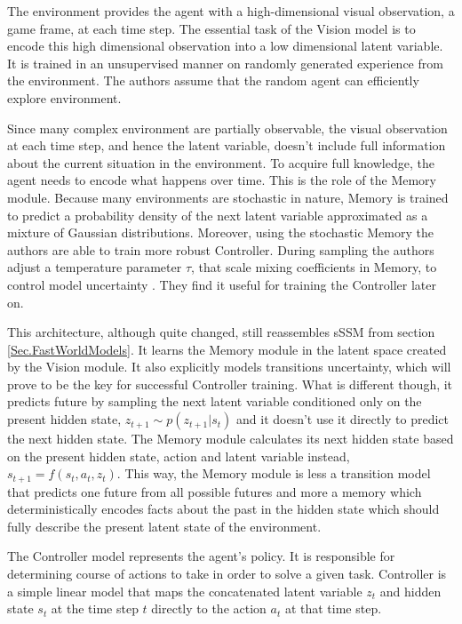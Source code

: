 The environment provides the agent with a high-dimensional visual observation, a game frame, at each time step. The essential task of the Vision model is to encode this high dimensional observation into a low dimensional latent variable. It is trained in an unsupervised manner on randomly generated experience from the environment. The authors assume that the random agent can efficiently explore environment.

Since many complex environment are partially observable, the visual observation at each time step, and hence the latent variable, doesn't include full information about the current situation in the environment. To acquire full knowledge, the agent needs to encode what happens over time. This is the role of the Memory module. Because many environments are stochastic in nature, Memory is trained to predict a probability density of the next latent variable approximated as a mixture of Gaussian distributions. Moreover, using the stochastic Memory the authors are able to train more robust Controller. During sampling the authors adjust a temperature parameter $\tau$, that scale mixing coefficients in Memory, to control model uncertainty \cite{Algo.Sketch-RNN}. They find it useful for training the Controller later on.

This architecture, although quite changed, still reassembles sSSM from section \ref{Sec.FastWorldModels}. It learns the Memory module in the latent space created by the Vision module. It also explicitly models transitions uncertainty, which will prove to be the key for successful Controller training. What is different though, it predicts future by sampling the next latent variable conditioned only on the present hidden state, $z_{t+1} \sim p(z_{t+1}|s_t)$ and it doesn't use it directly to predict the next hidden state. The Memory module calculates its next hidden state based on the present hidden state, action and latent variable instead, $s_{t+1} = f(s_t, a_t, z_t)$. This way, the Memory module is less a transition model that predicts one future from all possible futures and more a memory which deterministically encodes facts about the past in the hidden state which should fully describe the present latent state of the environment.

The Controller model represents the agent's policy. It is responsible for determining course of actions to take in order to solve a given task. Controller is a simple linear model that maps the concatenated latent variable $z_t$ and hidden state $s_t$ at the time step $t$ directly to the action $a_t$ at that time step.

